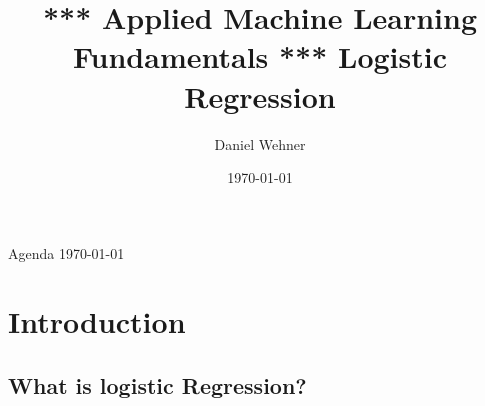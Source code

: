 


\title[Principal Component Analysis]{*** Applied Machine Learning Fundamentals *** Logistic Regression}
\author{Daniel Wehner}
\date{\today}




\maketitlepage


\begin{frame}{Agenda \today}
	\begin{multicols}{2}
		\tableofcontents
	\end{multicols}
\end{frame}


\section{Introduction}

\subsection{What is logistic Regression?}

